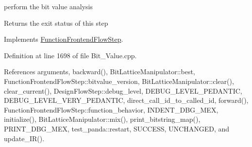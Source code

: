 perform the bit value analysis 

\begin{DoxyReturn}{Returns}
the exit status of this step 
\end{DoxyReturn}


Implements \hyperlink{classFunctionFrontendFlowStep_a00612f7fb9eabbbc8ee7e39d34e5ac68}{Function\+Frontend\+Flow\+Step}.



Definition at line 1698 of file Bit\+\_\+\+Value.\+cpp.



References arguments, backward(), Bit\+Lattice\+Manipulator\+::best, Function\+Frontend\+Flow\+Step\+::bitvalue\+\_\+version, Bit\+Lattice\+Manipulator\+::clear(), clear\+\_\+current(), Design\+Flow\+Step\+::debug\+\_\+level, D\+E\+B\+U\+G\+\_\+\+L\+E\+V\+E\+L\+\_\+\+P\+E\+D\+A\+N\+T\+IC, D\+E\+B\+U\+G\+\_\+\+L\+E\+V\+E\+L\+\_\+\+V\+E\+R\+Y\+\_\+\+P\+E\+D\+A\+N\+T\+IC, direct\+\_\+call\+\_\+id\+\_\+to\+\_\+called\+\_\+id, forward(), Function\+Frontend\+Flow\+Step\+::function\+\_\+behavior, I\+N\+D\+E\+N\+T\+\_\+\+D\+B\+G\+\_\+\+M\+EX, initialize(), Bit\+Lattice\+Manipulator\+::mix(), print\+\_\+bitstring\+\_\+map(), P\+R\+I\+N\+T\+\_\+\+D\+B\+G\+\_\+\+M\+EX, test\+\_\+panda\+::restart, S\+U\+C\+C\+E\+SS, U\+N\+C\+H\+A\+N\+G\+ED, and update\+\_\+\+I\+R().

